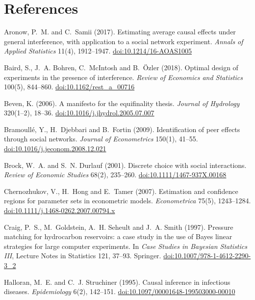 \documentclass[11pt]{article}
\begin{document}
\section*{References}
{\small\raggedright
\setlength{\parskip}{0.3em}
\noindent Aronow, P.~M. and C.~Samii (2017). Estimating average causal effects under general interference, with application to a social network experiment. \textit{Annals of Applied Statistics} 11(4), 1912--1947. \href{https://doi.org/10.1214/16-AOAS1005}{doi:10.1214/16-AOAS1005}

\noindent Baird, S., J.~A. Bohren, C.~McIntosh and B.~\"Ozler (2018). Optimal design of experiments in the presence of interference. \textit{Review of Economics and Statistics} 100(5), 844--860. \href{https://doi.org/10.1162/rest_a_00716}{doi:10.1162/rest\_a\_00716}

\noindent Beven, K. (2006). A manifesto for the equifinality thesis. \textit{Journal of Hydrology} 320(1--2), 18--36. \href{https://doi.org/10.1016/j.jhydrol.2005.07.007}{doi:10.1016/j.jhydrol.2005.07.007}

\noindent Bramoull\'e, Y., H.~Djebbari and B.~Fortin (2009). Identification of peer effects through social networks. \textit{Journal of Econometrics} 150(1), 41--55. \href{https://doi.org/10.1016/j.jeconom.2008.12.021}{doi:10.1016/j.jeconom.2008.12.021}

\noindent Brock, W.~A. and S.~N. Durlauf (2001). Discrete choice with social interactions. \textit{Review of Economic Studies} 68(2), 235--260. \href{https://doi.org/10.1111/1467-937X.00168}{doi:10.1111/1467-937X.00168}

\noindent Chernozhukov, V., H.~Hong and E.~Tamer (2007). Estimation and confidence regions for parameter sets in econometric models. \textit{Econometrica} 75(5), 1243--1284. \href{https://doi.org/10.1111/j.1468-0262.2007.00794.x}{doi:10.1111/j.1468-0262.2007.00794.x}

\noindent Craig, P.~S., M.~Goldstein, A.~H. Seheult and J.~A. Smith (1997). Pressure matching for hydrocarbon reservoirs: a case study in the use of Bayes linear strategies for large computer experiments. In \textit{Case Studies in Bayesian Statistics III}, Lecture Notes in Statistics 121, 37--93. Springer. \href{https://doi.org/10.1007/978-1-4612-2290-3_2}{doi:10.1007/978-1-4612-2290-3\_2}

\noindent Halloran, M.~E. and C.~J. Struchiner (1995). Causal inference in infectious diseases. \textit{Epidemiology} 6(2), 142--151. \href{https://doi.org/10.1097/00001648-199503000-00010}{doi:10.1097/00001648-199503000-00010}

}
\end{document}
